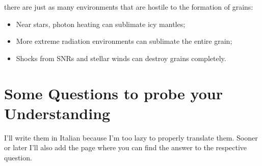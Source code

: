 there are just as many environments that are hostile to the formation of grains:
\begin{itemize}
    \item Near stars, photon heating can sublimate icy mantles;
    \item More extreme radiation environments can sublimate the entire grain;
    \item Shocks from SNRs and stellar winds can destroy grains completely.
\end{itemize}

\newpage
\section*{Some Questions to probe your Understanding}

I'll write them in Italian because I'm too lazy to properly translate them. Sooner or later I'll also add the page where you can find the answer to the respective question.

